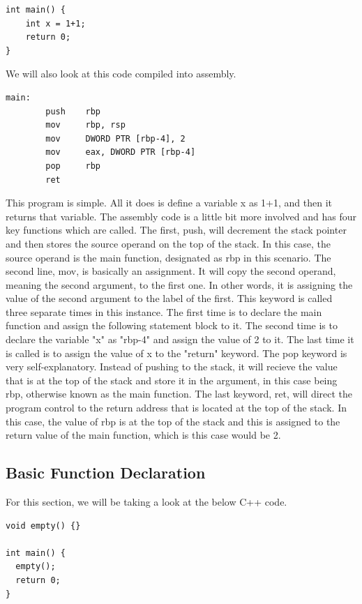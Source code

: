 \documentclass{article}
\theoremstyle{theorem}
\theoremstyle{definition}
\theoremstyle{remark}
\begin{document}
\begin{lstlisting}
int main() {
    int x = 1+1;
    return 0;
}
\end{lstlisting}

We will also look at this code compiled into assembly.

\begin{lstlisting}
main:
        push    rbp
        mov     rbp, rsp
        mov     DWORD PTR [rbp-4], 2
        mov     eax, DWORD PTR [rbp-4]
        pop     rbp
        ret
\end{lstlisting}

This program is simple. All it does is define a variable x as 1+1, and then it returns that variable. The assembly code is a little bit more involved and has four key functions which are called. The first, push, will decrement the stack pointer and then stores the source operand on the top of the stack. In this case, the source operand is the main function, designated as rbp in this scenario. The second line, mov, is basically an assignment. It will copy the second operand, meaning the second argument, to the first one. In other words, it is assigning the value of the second argument to the label of the first. This keyword is called three separate times in this instance. The first time is to declare the main function and assign the following statement block to it. The second time is to declare the variable "x" as "rbp-4" and assign the value of 2 to it. The last time it is called is to assign the value of x to the "return" keyword. The pop keyword is very self-explanatory. Instead of pushing to the stack, it will recieve the value that is at the top of the stack and store it in the argument, in this case being rbp, otherwise known as the main function. The last keyword, ret, will direct the program control to the return address that is located at the top of the stack. In this case, the value of rbp is at the top of the stack and this is assigned to the return value of the main function, which is this case would be 2.

\subsection{Basic Function Declaration}

For this section, we will be taking a look at the below C++ code.

\begin{lstlisting}
void empty() {}

int main() {
  empty();
  return 0;
}
\end{lstlisting}
\end{document}
